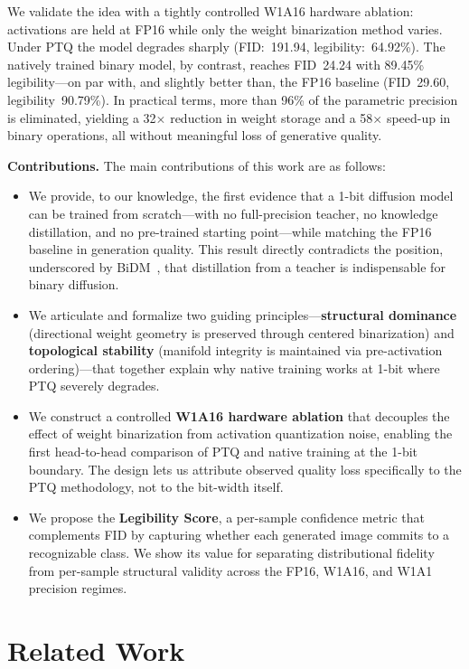 \documentclass[conference]{IEEEtran}
\begin{document}
We validate the idea with a tightly controlled W1A16 hardware ablation: activations are
held at FP16 while only the weight binarization method varies. Under PTQ the model
degrades sharply (FID:~191.94, legibility:~64.92\%). The natively trained binary model,
by contrast, reaches FID~24.24 with 89.45\% legibility---on par with, and slightly
better than, the FP16 baseline (FID~29.60, legibility~90.79\%). In practical terms,
more than 96\% of the parametric precision is eliminated, yielding a 32$\times$
reduction in weight storage and a 58$\times$ speed-up in binary operations, all without
meaningful loss of generative quality.

\textbf{Contributions.} The main contributions of this work are as follows:
\begin{itemize}
  \item We provide, to our knowledge, the first evidence that a 1-bit diffusion model
    can be trained from scratch---with no full-precision teacher, no knowledge
    distillation, and no pre-trained starting point---while matching the FP16 baseline
    in generation quality. This result directly contradicts the position, underscored by
    BiDM~\cite{bidm2024}, that distillation from a teacher is indispensable for binary
    diffusion.
  \item We articulate and formalize two guiding principles---\textbf{structural
    dominance} (directional weight geometry is preserved through centered binarization)
    and \textbf{topological stability} (manifold integrity is maintained via
    pre-activation ordering)---that together explain why native training works at 1-bit
    where PTQ severely degrades.
  \item We construct a controlled \textbf{W1A16 hardware ablation} that decouples the
    effect of weight binarization from activation quantization noise, enabling the first
    head-to-head comparison of PTQ and native training at the 1-bit boundary. The
    design lets us attribute observed quality loss specifically to the PTQ methodology,
    not to the bit-width itself.
  \item We propose the \textbf{Legibility Score}, a per-sample confidence metric that
    complements FID by capturing whether each generated image commits to a recognizable
    class. We show its value for separating distributional fidelity from per-sample
    structural validity across the FP16, W1A16, and W1A1 precision regimes.
\end{itemize}


\section{Related Work}
\end{document}
